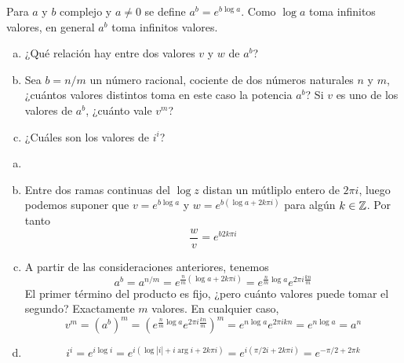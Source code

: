 \documentclass[twoside]{article}
\begin{document}
\begin{ejercicio}{4}
Para $a$ y $b$ complejo y $a\neq 0$ se define $a^b = e^{b\log a}$. Como $\log a$ toma infinitos valores, en general $a^b$ toma infinitos valores.
\begin{enumerate}[(a)]
\item ¿Qué relación hay entre dos valores $v$ y $w$ de $a^b$?
\item Sea $b=n/m$ un número racional, cociente de dos números naturales $n$ y $m$, ¿cuántos valores distintos toma en este caso la potencia $a^b$? Si $v$ es uno de los valores de $a^b$, ¿cuánto vale $v^m$?
\item ¿Cuáles son los valores de $i^i$?
\end{enumerate}
\end{ejercicio}
\begin{solucion}
\begin{enumerate}[(a)]
\item[]
\item Entre dos ramas continuas del $\log z$ distan un mútliplo entero de $2\pi i$, luego podemos suponer que $v=e^{b\log a}$ y $w = e^{b(\log a+2k\pi i)}$ para algún $k\in \mathbb{Z}$. Por tanto
$$
\frac{w}{v} = e^{b2k\pi i}
$$
\item A partir de las consideraciones anteriores, tenemos
$$
a^b=a^{n/m}=e^{\frac{n}{m}(\log a +2k\pi i)} = e^{\frac{n}{m}\log a}e^{2\pi i\frac{kn}{m}}
$$
El primer término del producto es fijo, ¿pero cuánto valores puede tomar el segundo? Exactamente $m$ valores. En cualquier caso,
$$
v^m= (a^b)^m = \left(e^{\frac{n}{m}\log a}e^{2\pi i\frac{kn}{m}}\right)^m = e^{n\log a}e^{2\pi ikn} = e^{n\log a} = a^n
$$
\item 
$$
i^i = e^{i \log i} = e^{i(\log|i|+i\arg i +2k\pi i)}=e^{i(\pi/2 i + 2k\pi i)}= e^{-\pi/2+2\pi k}
$$
\end{enumerate}
\end{solucion}
\newpage
\end{document}
